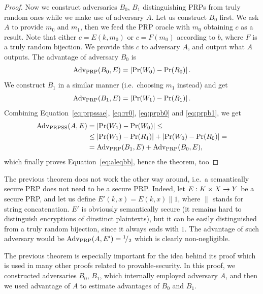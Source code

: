 \begin{proof}
	Now we construct adversaries $B_0$, $B_1$ distinguishing PRPs from truly random ones while we make use of adversary $A$. Let us construct $B_0$ first. We ask $A$ to provide $m_0$ and $m_1$, then we feed the PRP oracle with $m_0$ obtaining $c$ as a result. Note that either $c=E(k,m_0)$ or $c=F(m_0)$ according to $b$, where $F$ is a truly random bijection. We provide this $c$ to adversary $A$, and output what $A$ outputs. The advantage of adversary $B_0$ is
	\begin{equation}
	\label{eq:prpb0}
		\operatorname*{Adv_{PRP}}(B_0,E) = \left| \Pr(W_0) - \Pr(R_0) \right| .
	\end{equation}
	We construct $B_1$ in a similar manner (i.e.\ choosing $m_1$ instead) and get
	\begin{equation}
	\label{eq:prpb1}
		\operatorname*{Adv_{PRP}}(B_1,E) = \left| \Pr(W_1) - \Pr(R_1) \right| .
	\end{equation}
	Combining Equation~\ref{eq:prpssae}, \ref{eq:rr0}, \ref{eq:prpb0} and \ref{eq:prpb1}, we get
	\begin{align*}
		\operatorname*{Adv_{PRPSS}}(A,E) &= \left| \Pr(W_1) - \Pr(W_0) \right| \leq \\
		&\leq \left| \Pr(W_1) - \Pr(R_1) \right| + \left| \Pr(W_0) - \Pr(R_0) \right| = \\
		&= \operatorname*{Adv_{PRP}}(B_1,E) + \operatorname*{Adv_{PRP}}(B_0,E) ,
	\end{align*}
	which finally proves Equation~\ref{eq:aleqbb}, hence the theorem, too
\end{proof}

\begin{note}
	The previous theorem does not work the other way around, i.e.\ a semantically secure PRP does not need to be a secure PRP. Indeed, let $E: K\times X\rightarrow Y$ be a secure PRP, and let us define $E'(k,x) = E(k,x)\|1$, where $\|$ stands for string concatenation. $E'$ is obviously semantically secure (it remains hard to distinguish encryptions of dinstinct plaintexts), but it can be easily distinguished from a truly random bijection, since it always ends with $1$. The advantage of such adversary would be $\operatorname*{Adv_{PRP}}(A,E') = {}^{1}\!/_{2}$ which is clearly non-negligible.
\end{note}

The previous theorem is especially important for the idea behind its proof which is used in many other proofs related to provable-security. In this proof, we constructed adversaries $B_0$, $B_1$, which internally employed adversary $A$, and then we used advantage of $A$ to estimate advantages of $B_0$ and $B_1$.


